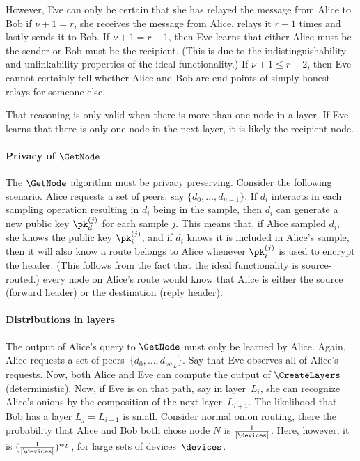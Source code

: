 However, Eve can only be certain that she has relayed the message from Alice to 
Bob if \(\nu+1 = r\), \ie she receives the message from Alice, relays it 
\(r-1\) times and lastly sends it to Bob.
If \(\nu+1 = r-1\), then Eve learns that either Alice must be the sender or Bob 
must be the recipient.
(This is due to the indistinguishability and unlinkability properties of the 
ideal functionality.)
If \(\nu+1 \leq r-2\), then Eve cannot certainly tell whether Alice and Bob are 
end points of simply honest relays for someone else.

That reasoning is only valid when there is more than one node in a layer.
If Eve learns that there is only one node in the next layer, it is likely the 
recipient node.

\paragraph*{Privacy of \(\GetNode\)}

The \(\GetNode\) algorithm must be privacy preserving.
Consider the following scenario.
Alice requests a set of peers, say \(\{d_0, \dotsc, d_{n-1}\}\).
If \(d_i\) interacts in each sampling operation resulting in \(d_i\) being in 
the sample, then \(d_i\) can generate a new public key \(\pk_d^{(j)}\) for each 
sample \(j\).
This means that, if Alice sampled \(d_i\), she knows the public key 
\(\pk_i^{(j)}\), and if \(d_i\) knows it is included in Alice's sample, then it 
will also know a route belongs to Alice whenever \(\pk_i^{(j)}\) is used to 
encrypt the header.
(This follows from the fact that the ideal functionality is source-routed.)
\Ie every node on Alice's route would know that Alice is either the source 
(forward header) or the destination (reply header).

\paragraph*{Distributions in layers}

The output of Alice's query to \(\GetNode\) must only be learned by Alice.
Again, Alice requests a set of peers~\(\{d_0, \dotsc, d_{\nu w_L}\}\).
Say that Eve observes all of Alice's requests.
Now, both Alice and Eve can compute the output of \(\CreateLayers\) 
(deterministic).
Now, if Eve is on that path, say in layer~\(L_i\), she can recognize Alice's 
onions by the composition of the next layer~\(L_{i+1}\).
The likelihood that Bob has a layer \(L_j = L_{i+1}\) is small.
Consider normal onion routing, there the probability that Alice and Bob both 
chose node \(N\) is \(\frac{1}{|\devices|}\).
Here, however, it is \((\frac{1}{|\devices|})^{w_L}\), for large sets of 
devices~\(\devices\).

